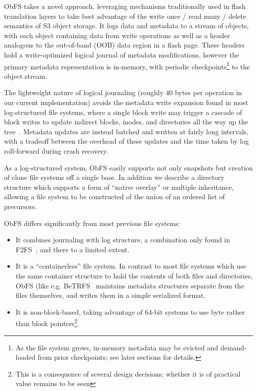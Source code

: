 \documentclass[sigconf,anonymous,10pt]{acmart}
\begin{document}
\begin{CCSXML}
ObFS takes a novel approach, leveraging mechanisms traditionally used in flash translation layers to take best advantage of the write once / read many / delete semantics of S3 object storage.
It logs data and metadata to a stream of objects, with each object containing data from write operations as well as a header analogous to the out-of-band (OOB) data region in a flash page.
These headers hold a write-optimized logical journal of metadata modifications, however the primary metadata representation is in-memory, with periodic checkpoints\footnote{%
  As the file system grows, in-memory metadata may be evicted and demand-loaded from prior checkpoints; see later sections for details.} to the object stream.

The lightweight nature of logical journaling (roughly 40 bytes per operation in our current implementation) avoids the metadata write expansion found in most log-structured file systems, where a single block write may trigger a cascade of block writes to update indirect blocks, inodes, and directories all the way up the tree~\cite{hitz_file_1994}.
Metadata updates are instead batched and written at fairly long intervals, with a tradeoff between the overhead of these updates and the time taken by log roll-forward during crash recovery.

As a log-structured system, ObFS easily supports not only snapshots but creation of clone file systems off a single base.
In addition we describe a directory structure which supports a form of ``native overlay'' or multiple inheritance, allowing a file system to be constructed of the union of an ordered list of precursors.

ObFS differs significantly from most previous file systems:
\begin{itemize}[nosep]
\item It combines journaling with log structure, a combination only found in F2FS~\cite{lee_f2fs_2015}, and there to a limited extent.
\item It is a ``containerless'' file system. In contrast to most file systems which use the same container structure to hold the contents of both files and directories, ObFS (like e.g. BeTRFS~\cite{jannen_betrfs_2015} maintains metadata structures separate from the files themselves, and writes them in a simple serialized format.
\item It is non-block-based, taking advantage of 64-bit systems to use byte rather than block pointers\footnote{This is a consequence of several design decisions; whether it is of practical value remains to be seen}.
\end{itemize}


\end{CCSXML}
\end{document}
